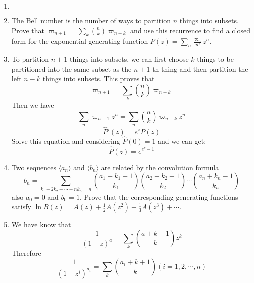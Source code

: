 \documentclass[12pt,a4paper]{article}
\makeatletter
\newtheorem*{solution}{Solution}
\theoremstyle{definition}
\renewenvironment{solution}[1][Solution] {\par\pushQED{\qed}\normalfont\topsep6\p@\@plus6\p@\relax\trivlist\item[\hskip\labelsep\bfseries#1\@addpunct{.}]\ignorespaces}{\popQED\endtrivlist\@endpefalse} \makeatother
\makeatother
\begin{document}
\begin{enumerate}
\begin{solution}
\begin{equation*}
        	\end{equation*}
        \end{solution}
    \item 
        The Bell number is the number of ways to partition $n$ things into subsets. Prove that $\varpi_{n+1}=\sum_k\binom{n}{k} \varpi_{n-k}$ and use this recurrence to find a closed form for the exponential generating function $P(z)=\sum_n \frac{\varpi_n}{n!} z^n$.
        \begin{solution}
        	To partition $n+1$ things into subsets, we can first choose $k$ things to be partitioned into the same subset as the $n+1$-th thing and then partition the left $n-k$ things into subsets. This proves that
        	\begin{equation*}
        	    \varpi_{n+1}=\sum_k \binom{n}{k}\varpi_{n-k}
        	\end{equation*}
        	Then we have 
        	\begin{equation*}
        	    \sum_n \varpi_{n+1}z^n =\sum_n \binom{n}{k} \varpi_{n-k} z^n
        	\end{equation*}
        	\begin{equation*}
        	    \hat{P}'(z)=e^zP(z)
        	\end{equation*}
        	Solve this equation and considering $\hat{P}(0)=1$ and we can get:
        	\begin{equation*}
        	    \hat{P}(z)=e^{e^z-1}
        	\end{equation*}
        \end{solution}
    \item 
        Two sequences $\langle a_n \rangle$ and $\langle b_n \rangle$ are related by the convolution formula
        \begin{equation}\label{T1}
            b_n=\sum_{k_1+2k_2+\cdots+nk_n=n}\binom{a_1+k_1-1}{k_1}\binom{a_2+k_2-1}{k_2}\cdots\binom{a_n+k_n-1}{k_n}
        \end{equation}
        also $a_0=0$ and $b_0=1$. Prove that the corresponding generating functions satisfy $\ln B(z)=A(z)+\frac{1}{2}A(z^2)+\frac{1}{3}A(z^3)+\cdots$.
        \begin{solution}
        	We have know that
        	\begin{equation*}
        	    \frac{1}{(1-z)^a}=\sum_k \binom{a+k-1}{k}z^k
        	\end{equation*}
        	Therefore 
        	\begin{equation*}
        	    \frac{1}{(1-z^i)^{a_i}}=\sum_k \binom{a_i+k+1}{k}(i=1,2,\cdots,n)

\end{equation*}
\end{solution}
\end{enumerate}
\end{document}
